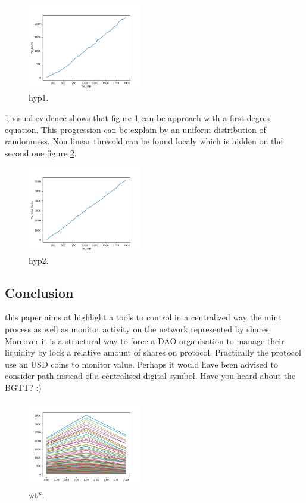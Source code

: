 \documentclass{article}
\begin{document}
\begin{multicols}{2}[]
\begin{figure}[H]
\centering\includegraphics[width=5cm]{figure3}
\caption{hyp1.}
\label{proof}
\end{figure}
\ref{proof} visual evidence shows that figure \ref{proof} can be approach with a first degres equation. This progression can be explain by an uniform distribution of randomness. Non linear thresold can be found localy which is hidden on the second one figure \ref{proof2}.
\begin{figure}[H]
\centering\includegraphics[width=5cm]{figure4}
\caption{hyp2.}
\label{proof2}
\end{figure}

\subsection{Conclusion}
this paper aims at highlight a tools to control in a centralized way the mint process as well as monitor activity on the network represented by shares. Moreover it is a structural way to force a DAO organisation to manage their liquidity by lock a relative amount of shares on protocol.
 Practically the protocol use an USD coins to monitor value. Perhaps it would have been advised to consider path instead of a centralised digital symbol. Have you heard about the BGTT? :)
\end{multicols}

\begin{figure}[H]
\centering\includegraphics[width=5cm]{wtf}
\caption{wt*.}
\end{figure}



 

\end{document}
